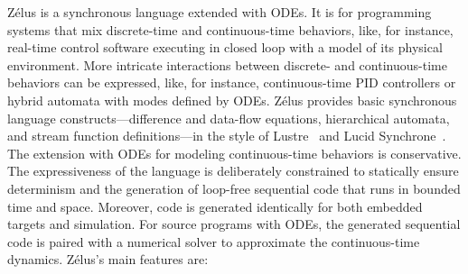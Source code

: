\documentclass[11pt,titlepage,twoside]{report}
\newcommand{\zelus}{{\sf Z\'elus}}
\newcommand{\lustre}{{\sf Lustre}}
\newcommand{\lucy}{{\sf Lucid Synchrone}}
\begin{document}
\zelus{} is a synchronous language extended with
\acp{ODE}.
It is for programming systems that mix discrete-time and continuous-time
behaviors, like, for instance, real-time control software executing in 
closed loop with a model of its physical environment.
More intricate interactions between discrete- and continuous-time behaviors 
can be expressed, like, for instance, continuous-time PID controllers or 
hybrid automata with modes defined by \acp{ODE}.
\zelus{} provides basic synchronous language constructs---difference and 
data-flow equations, hierarchical automata, and stream function 
definitions---in the style of \lustre~\cite{lustre:ieee91} and
\lucy~\cite{lucy:iste07}.
The extension with \acp{ODE} for modeling continuous-time behaviors is 
conservative.
The expressiveness of the language is deliberately constrained to statically 
ensure determinism and the generation of loop-free sequential code that runs 
in bounded time and space. Moreover, code is generated identically for both 
embedded targets and simulation. For source programs with \acp{ODE}, the 
generated sequential code is paired with a numerical solver to approximate 
the continuous-time dynamics.
%
\zelus's main features are:
\end{document}
